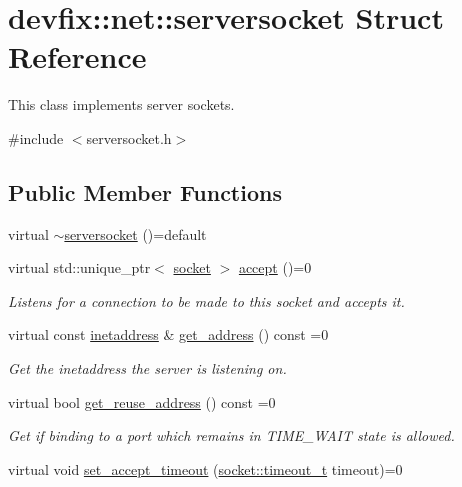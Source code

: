 \hypertarget{structdevfix_1_1net_1_1serversocket}{}\section{devfix\+:\+:net\+:\+:serversocket Struct Reference}
\label{structdevfix_1_1net_1_1serversocket}


This class implements server sockets.  




{\ttfamily \#include $<$serversocket.\+h$>$}

\subsection*{Public Member Functions}
\begin{DoxyCompactItemize}
\item 
virtual \hyperlink{structdevfix_1_1net_1_1serversocket_afd9f315c4018808c790478710f52d8ab}{$\sim$serversocket} ()=default
\item 
virtual std\+::unique\+\_\+ptr$<$ \hyperlink{structdevfix_1_1net_1_1socket}{socket} $>$ \hyperlink{structdevfix_1_1net_1_1serversocket_a7b3ea6aad486060acdd1385a08f7db81}{accept} ()=0
\begin{DoxyCompactList}\small\item\em Listens for a connection to be made to this socket and accepts it. \end{DoxyCompactList}\item 
virtual const \hyperlink{structdevfix_1_1net_1_1inetaddress}{inetaddress} \& \hyperlink{structdevfix_1_1net_1_1serversocket_a28fc78cccaa3a40441399ac3b32abec8}{get\+\_\+address} () const =0
\begin{DoxyCompactList}\small\item\em Get the {\itshape inetaddress} the server is listening on. \end{DoxyCompactList}\item 
virtual bool \hyperlink{structdevfix_1_1net_1_1serversocket_afb5435c5f70649e8e66c35b3cf907e25}{get\+\_\+reuse\+\_\+address} () const =0
\begin{DoxyCompactList}\small\item\em Get if binding to a port which remains in T\+I\+M\+E\+\_\+\+W\+A\+IT state is allowed. \end{DoxyCompactList}\item 
virtual void \hyperlink{structdevfix_1_1net_1_1serversocket_ae67a25cf26fe54ce7b10d07ff9219ce7}{set\+\_\+accept\+\_\+timeout} (\hyperlink{structdevfix_1_1net_1_1socket_a80a3bf4cb7292bae31ea9c6575539c68}{socket\+::timeout\+\_\+t} timeout)=0

\end{DoxyCompactItemize}
